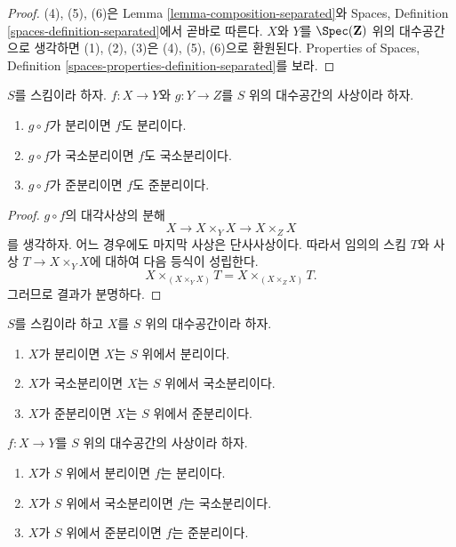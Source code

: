 \begin{proof}
(4), (5), (6)은 Lemma \ref{lemma-composition-separated}와
Spaces, Definition \ref{spaces-definition-separated}에서 곧바로 따른다.
$X$와 $Y$를 $\Spec(\mathbf{Z})$ 위의 대수공간으로 생각하면
(1), (2), (3)은 (4), (5), (6)으로 환원된다.
Properties of Spaces, Definition
\ref{spaces-properties-definition-separated}를 보라.
\end{proof}

\begin{lemma}
\label{lemma-compose-after-separated}
$S$를 스킴이라 하자.
$f : X \to Y$와 $g : Y \to Z$를 $S$ 위의 대수공간의 사상이라 하자.
\begin{enumerate}
\item $g \circ f$가 분리이면 $f$도 분리이다.
\item $g \circ f$가 국소분리이면 $f$도 국소분리이다.
\item $g \circ f$가 준분리이면 $f$도 준분리이다.
\end{enumerate}
\end{lemma}

\begin{proof}
$g \circ f$의 대각사상의 분해
$$
X \to X \times_Y X \to X \times_Z X
$$
를 생각하자. 어느 경우에도 마지막 사상은 단사사상이다.
따라서 임의의 스킴 $T$와 사상 $T \to X \times_Y X$에 대하여
다음 등식이 성립한다.
$$
X \times_{(X \times_Y X)} T = X \times_{(X \times_Z X)} T.
$$
그러므로 결과가 분명하다.
\end{proof}

\begin{lemma}
\label{lemma-separated-implies-morphism-separated}
$S$를 스킴이라 하고 $X$를 $S$ 위의 대수공간이라 하자.
\begin{enumerate}
\item $X$가 분리이면 $X$는 $S$ 위에서 분리이다.
\item $X$가 국소분리이면 $X$는 $S$ 위에서 국소분리이다.
\item $X$가 준분리이면 $X$는 $S$ 위에서 준분리이다.
\end{enumerate}
$f : X \to Y$를 $S$ 위의 대수공간의 사상이라 하자.
\begin{enumerate}
\item[(4)] $X$가 $S$ 위에서 분리이면 $f$는 분리이다.
\item[(5)] $X$가 $S$ 위에서 국소분리이면 $f$는 국소분리이다.
\item[(6)] $X$가 $S$ 위에서 준분리이면 $f$는 준분리이다.
\end{enumerate}
\end{lemma}

